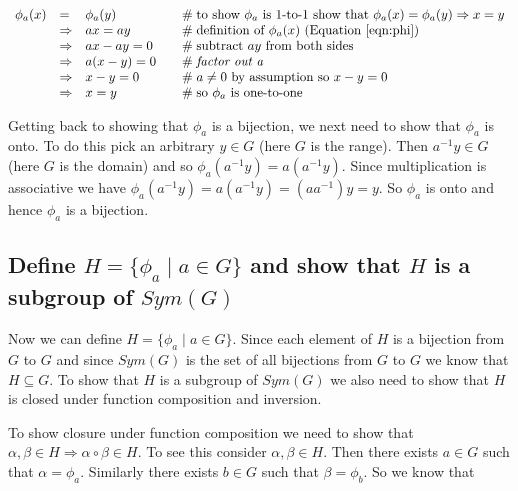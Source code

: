 \documentclass{article}
\theoremstyle{definition}
\begin{document}
\begin{equation*}
\begin{array}{llll}
\phi_{a}(x)  
&=&                 \phi_{a}(y)                         &\quad  \mathrel{\#} \text{to show $\phi_a$ is 1-to-1 show that } \phi_a(x) = \phi_a(y) \Rightarrow x = y \\
&\Rightarrow& ax = ay                            &\quad  \mathrel{\#} \text{definition of $\phi_a(x)$ (\text{Equation \ref{eqn:phi})}}            \\
&\Rightarrow& ax-ay = 0                         &\quad  \mathrel{\#} \text{subtract $ay$ from both sides} \\
&\Rightarrow&  a (x-y) = 0                      &\quad  \mathrel{\#} \textit{factor out a}                            \\
&\Rightarrow&  x - y     = 0                       &\quad  \mathrel{\#} a \neq 0 \text{ by assumption so } x - y = 0  \\
&\Rightarrow&  x = y                               &\quad  \mathrel{\#} \text{so $\phi_{a}$ is one-to-one}
\end{array}
\end{equation*}

\bigskip
\noindent
Getting back to showing that $\phi_{a}$ is a bijection, we next need to show that $\phi_{a}$ is onto. To do this pick an arbitrary $y \in G$ (here $G$ is the range).  
Then $a^{-1}y \in G$ (here $G$ is the domain) and so $\phi_{a}(a^{-1}y) = a(a^{-1}y)$. Since multiplication is associative we have 
$\phi_{a}(a^{-1}y) = a(a^{-1}y) = (aa^{-1})y = y$. So $\phi_{a}$ is onto and hence $\phi_{a}$ is a bijection.
 
 
\subsection{Define $H = \{\phi_{a} \mid a \in G\}$ and show that $H$ is a subgroup of $Sym(G)$}
Now we can define $H = \{\phi_a \mid a \in G\}$. Since each element of $H$ is a bijection from $G$ to $G$ and since $Sym(G)$ is the set of all
bijections from $G$ to $G$ we know that $H \subseteq G$. To show that $H$ is a subgroup of $Sym(G)$ we also need to show that $H$ is closed under function 
composition and  inversion.  

\bigskip
\noindent
To show closure under function composition we need to show that $\alpha, \beta \in H \Rightarrow \alpha \circ \beta \in H$.  To see this consider 
$\alpha, \beta \in H$. Then there exists $a \in G$ such that $\alpha = \phi_{a}$. Similarly there exists $b \in G$ such that $\beta = \phi_b$. So we 
know that
\end{document}
